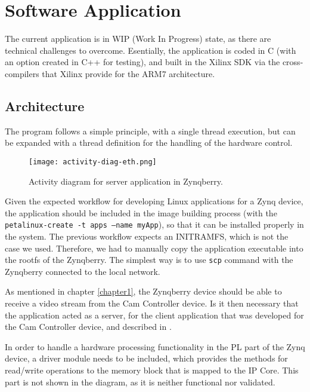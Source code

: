 
\chapter{Software Application} \label{software-application}

The current application is in WIP (Work In Progress) state, as there are technical challenges to
overcome. Esentially, the application is coded in C (with an option created in C++ for testing), and
built in the Xilinx SDK via the cross-compilers that Xilinx provide for the ARM7 architecture.

\section{Architecture}

The program follows a simple principle, with a single thread execution, but can be expanded with a
thread definition for the handling of the hardware control.

\begin{figure}[htp]
	\centering
	\texttt{[image: activity-diag-eth.png]}
	\caption{Activity diagram for server application in Zynqberry.}
	\label{fig:activity-diag-eth}
\end{figure}

Given the expected workflow for developing Linux applications for a Zynq device, the application
should be included in the image building process (with the
\texttt{petalinux-create -t apps --name myApp}), so that it can be installed properly in the system.
The previous workflow expects an INITRAMFS, which is not the case we used. Therefore, we had to
manually copy the application executable into the rootfs of the Zynqberry. The simplest way is to
use \texttt{scp} command with the Zynqberry connected to the local network.

As mentioned in chapter \ref{chapter1}, the Zynqberry device should be able to receive a video
stream from the Cam Controller device. Is it then necessary that the application acted as a server,
for the client application that was developed for the Cam Controller device, and described in
\cite{Poliakov2018}.

In order to handle a hardware processing functionality in the PL part of the Zynq device, a driver
module needs to be included, which provides the methods for read/write operations to the memory
block that is mapped to the IP Core. This part is not shown in the diagram, as it is neither
functional nor validated.

